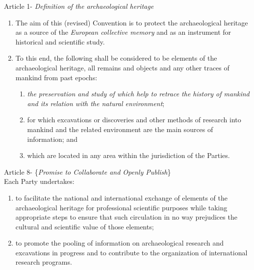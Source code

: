 \documentclass[spanish]{ijsra}
\begin{document}
\begin{displayquote}
	Article 1- \textit{Definition of the archaeological heritage}
	\begin{enumerate}
		\item The aim of this (revised) Convention is to protect the archaeological heritage as a source of the \textit{European collective memory} and as an instrument for historical and scientific study.
		\item To this end, {the following} shall be considered to be elements of the archaeological heritage, all remains and objects and any other traces of mankind from past epochs:
		\begin{enumerate}
			\item \textit{the preservation and study of which help to retrace the history of mankind and its relation with the natural environment};
			\item for which excavations or discoveries and other methods of research into mankind and the related environment are the main sources of information; and
			\item which are located in any area within the jurisdiction of the Parties. %
		\end{enumerate}
	\end{enumerate}
	Article 8- \{\textit{Promise to Collaborate and Openly Publish}\}\\
	Each Party undertakes:
	\begin{enumerate}
		\item to facilitate the national and international exchange of elements of the archaeological heritage for professional scientific purposes while taking appropriate steps to ensure that such circulation in no way prejudices the cultural and scientific value of those elements;
		\item to promote the pooling of information on archaeological research and excavations in progress and to contribute to the organization of international research programs. %
	\end{enumerate}
\end{displayquote}
\end{document}
